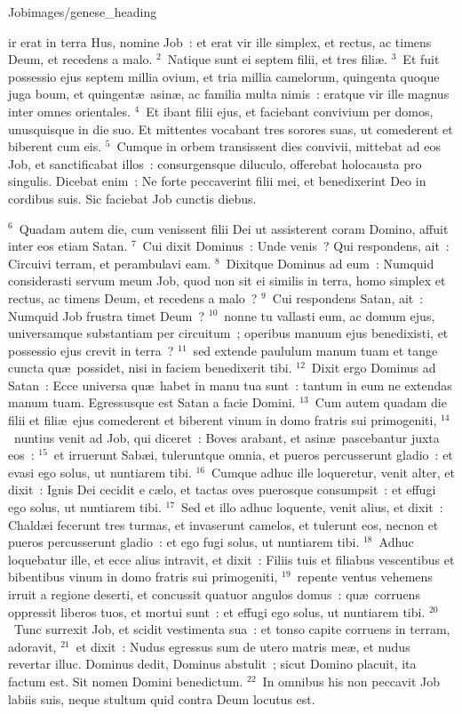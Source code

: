 {Job}{images/genese_heading}


\bchapter
{}ir erat in terra Hus, nomine Job~: et erat vir ille simplex, et rectus, ac timens Deum, et recedens a malo.
${}^{2}$~Natique sunt ei septem filii, et tres fili\ae .
${}^{3}$~Et fuit possessio ejus septem millia ovium, et tria millia camelorum, quingenta quoque juga boum, et quingent\ae\ asin\ae , ac familia multa nimis~: eratque vir ille magnus inter omnes orientales.
${}^{4}$~Et ibant filii ejus, et faciebant convivium per domos, unusquisque in die suo. Et mittentes vocabant tres sorores suas, ut comederent et biberent cum eis.
${}^{5}$~Cumque in orbem transissent dies convivii, mittebat ad eos Job, et sanctificabat illos~: consurgensque diluculo, offerebat holocausta pro singulis. Dicebat enim~: Ne forte peccaverint filii mei, et benedixerint Deo in cordibus suis. Sic faciebat Job cunctis diebus.


${}^{6}$~Quadam autem die, cum venissent filii Dei ut assisterent coram Domino, affuit inter eos etiam Satan.
${}^{7}$~Cui dixit Dominus~: Unde venis~? Qui respondens, ait~: Circuivi terram, et perambulavi eam.
${}^{8}$~Dixitque Dominus ad eum~: Numquid considerasti servum meum Job, quod non sit ei similis in terra, homo simplex et rectus, ac timens Deum, et recedens a malo~?
${}^{9}$~Cui respondens Satan, ait~: Numquid Job frustra timet Deum~?
${}^{10}$~nonne tu vallasti eum, ac domum ejus, universamque substantiam per circuitum~; operibus manuum ejus benedixisti, et possessio ejus crevit in terra~?
${}^{11}$~sed extende paululum manum tuam et tange cuncta qu\ae\ possidet, nisi in faciem benedixerit tibi.
${}^{12}$~Dixit ergo Dominus ad Satan~: Ecce universa qu\ae\ habet in manu tua sunt~: tantum in eum ne extendas manum tuam. Egressusque est Satan a facie Domini.
${}^{13}$~Cum autem quadam die filii et fili\ae\ ejus comederent et biberent vinum in domo fratris sui primogeniti,
${}^{14}$~nuntius venit ad Job, qui diceret~: Boves arabant, et asin\ae\ pascebantur juxta eos~:
${}^{15}$~et irruerunt Sab\ae i, tuleruntque omnia, et pueros percusserunt gladio~: et evasi ego solus, ut nuntiarem tibi.
${}^{16}$~Cumque adhuc ille loqueretur, venit alter, et dixit~: Ignis Dei cecidit e c\ae lo, et tactas oves puerosque consumpsit~: et effugi ego solus, ut nuntiarem tibi.
${}^{17}$~Sed et illo adhuc loquente, venit alius, et dixit~: Chald\ae i fecerunt tres turmas, et invaserunt camelos, et tulerunt eos, necnon et pueros percusserunt gladio~: et ego fugi solus, ut nuntiarem tibi.
${}^{18}$~Adhuc loquebatur ille, et ecce alius intravit, et dixit~: Filiis tuis et filiabus vescentibus et bibentibus vinum in domo fratris sui primogeniti,
${}^{19}$~repente ventus vehemens irruit a regione deserti, et concussit quatuor angulos domus~: qu\ae\ corruens oppressit liberos tuos, et mortui sunt~: et effugi ego solus, ut nuntiarem tibi.
${}^{20}$~Tunc surrexit Job, et scidit vestimenta sua~: et tonso capite corruens in terram, adoravit,
${}^{21}$~et dixit~: Nudus egressus sum de utero matris me\ae , et nudus revertar illuc. Dominus dedit, Dominus abstulit~; sicut Domino placuit, ita factum est. Sit nomen Domini benedictum.
${}^{22}$~In omnibus his non peccavit Job labiis suis, neque stultum quid contra Deum locutus est.

